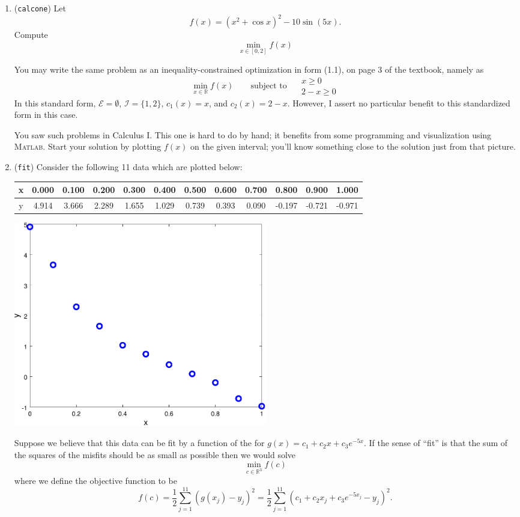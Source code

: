 \documentclass[11pt]{amsart}
\newcommand{\RR}{\mathbb{R}}
\newcommand{\Matlab}{\textsc{Matlab}\xspace}
\begin{document}
\bigskip
\renewcommand{\labelenumi}{\Roman{enumi}. \quad}
\begin{enumerate}
\item (\texttt{calcone})  \quad Let
    $$f(x) = \left(x^2 + \cos x\right)^2 - 10 \sin(5 x).$$
Compute
    $$\min_{x\in [0,2]} f(x)$$

You may write the same problem as an inequality-constrained optimization in form (1.1), on page 3 of the textbook, namely as
	$$\min_{x\in\RR} f(x) \qquad \text{subject to }\quad \begin{matrix} x \ge 0 \\ 2 - x \ge 0\end{matrix}$$
In this standard form, $\mathcal{E}=\emptyset$, $\mathcal{I}=\{1,2\}$, $c_1(x)=x$, and $c_2(x)=2-x$.  However, I assert no particular benefit to this standardized form in this case.

You saw such problems in Calculus I.  This one is hard to do by hand; it benefits from some programming and visualization using \Matlab.  Start your solution by plotting $f(x)$ on the given interval; you'll know something close to the solution just from that picture.


\medskip
\item (\texttt{fit})  \quad Consider the following 11 data which are plotted below:

\bigskip
\begin{tabular}{c|ccccccccccc}
x & 0.000 & 0.100 & 0.200 & 0.300 & 0.400 & 0.500 & 0.600 & 0.700 &  0.800 &  0.900 &  1.000 \\
\hline
y & 4.914 & 3.666 & 2.289 & 1.655 & 1.029 & 0.739 & 0.393 & 0.090 & -0.197 & -0.721 & -0.971
\end{tabular}

\bigskip
\begin{center}
\includegraphics[width=0.5\textwidth]{fitdata}
\end{center}

\medskip
Suppose we believe that this data can be fit by a function of the for $g(x) = c_1 + c_2 x + c_3 e^{-5 x}$.  If the sense of ``fit'' is that the sum of the squares of the misfits should be as small as possible then we would solve
	$$\min_{c \in \RR^3} f(c)$$
where we define the objective function to be
	$$f(c) = \frac{1}{2} \sum_{j=1}^{11} \left(g(x_j) - y_j\right)^2 = \frac{1}{2} \sum_{j=1}^{11} \left(c_1 + c_2 x_j + c_3 e^{-5 x_j} - y_j\right)^2.$$


\end{enumerate}
\end{document}
